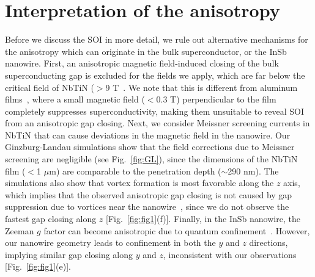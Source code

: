 \section{Interpretation of the anisotropy}
Before we discuss the SOI in more detail, we rule out alternative mechanisms for the anisotropy which can originate in the bulk superconductor, or the InSb nanowire.
First, an anisotropic magnetic field-induced closing of the bulk superconducting gap is excluded for the fields we apply, which are far below the critical field of NbTiN ($>$9 T~\cite{VanWoerkom2015}.
We note that this is different from aluminum films~\cite{Chang2015,Deng2016,Gazibegovic2017,Zhang2018}, where a small magnetic field ($<$0.3 T) perpendicular to the film completely suppresses superconductivity, making them unsuitable to reveal SOI from an anisotropic gap closing.
Next, we consider Meissner screening currents in NbTiN that can cause deviations in the magnetic field in the nanowire.
Our Ginzburg-Landau simulations show that the field corrections due to Meissner screening are negligible (see Fig.~\ref{fig:GL}), since the dimensions of the NbTiN film ($<$1 $\mu$m) are comparable to the penetration depth ($\sim$290 nm).
The simulations also show that vortex formation is most favorable along the $z$ axis, which implies that the observed anisotropic gap closing is not caused by gap suppression due to vortices near the nanowire~\cite{Takei2013}, since we do not observe the fastest gap closing along $z$ [Fig.~\ref{fig:fig1}(f)].
Finally, in the InSb nanowire, the Zeeman $g$ factor can become anisotropic due to quantum confinement~\cite{Nadj-Perge2012,Pryor2006,Qu2016}.
However, our nanowire geometry leads to confinement in both the $y$ and $z$ directions, implying similar gap closing along $y$ and $z$, inconsistent with our observations [Fig.~\ref{fig:fig1}(e)].

